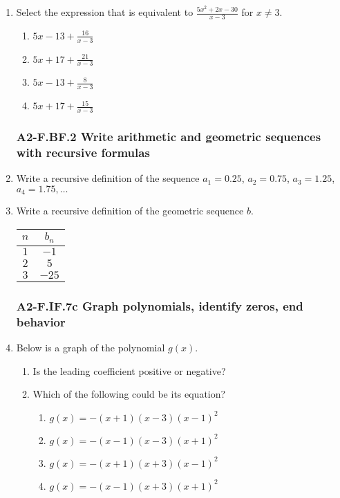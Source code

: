\documentclass[12pt, twoside]{article}
\begin{document}
\begin{enumerate}[itemsep=0.5cm]
\item Select the expression that is equivalent to $\displaystyle \frac{5x^2 + 2x - 30}{x - 3}$ for $x \neq 3$.
    \begin{enumerate}
        \item $\displaystyle 5x - 13 + \frac{16}{x - 3}$
        \item $\displaystyle 5x + 17 + \frac{21}{x - 3}$
        \item $\displaystyle 5x - 13 + \frac{8}{x - 3}$
        \item $\displaystyle 5x + 17 + \frac{15}{x - 3}$
    \end{enumerate}
    \vspace{3cm}

\newpage
\subsubsection*{A2-F.BF.2 Write arithmetic and geometric sequences with recursive formulas}
\item Write a recursive definition of the sequence $a_1 = 0.25$, $a_2 = 0.75$, $a_3 = 1.25$, $a_4 = 1.75, \ldots$ \vspace{2cm}

\item Write a recursive definition of the geometric sequence $b$. \\[0.5cm]
\renewcommand{\arraystretch}{1.5}
\begin{tabular}{|c|c|}
\hline
$n$ & $b_n$ \\
\hline
$1$ & $-1$ \\
$2$ & $5$ \\
$3$ & $-25$ \\
\hline
\end{tabular} \vspace{1cm}

\newpage 
\subsubsection*{A2-F.IF.7c Graph polynomials, identify zeros, end behavior}
\item Below is a graph of the polynomial $g(x)$. 
\begin{multicols}{2}
    \begin{enumerate}[itemsep=1cm]
        \item Is the leading coefficient positive or negative?
        \item Which of the following could be its equation?
        \begin{enumerate}
            \item $g(x) = -(x+1)(x-3)(x-1)^2$
            \item $g(x) = -(x-1)(x-3)(x+1)^2$
            \item $g(x) = -(x+1)(x+3)(x-1)^2$
            \item $g(x) = -(x-1)(x+3)(x+1)^2$
        \end{enumerate} \vspace{1cm} \;
    \end{enumerate}


\end{multicols}
\end{enumerate}
\end{document}
